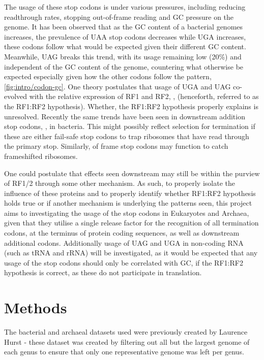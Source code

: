 \documentclass[
    emulatestandardclasses,
    parskip=half,
]{scrartcl}
\begin{document}
        The usage of these stop codons is under various pressures, including reducing readthrough rates, stopping out-of-frame reading and GC pressure on the genome. It has been observed that as the GC content of a bacterial genomes increases, the prevalence of UAA stop codons decreases while UGA increases, these codons follow what would be expected given their different GC content. Meanwhile, UAG breaks this trend, with its usage remaining low (20\%) and independent of the GC content of the genome, countering what otherwise be expected especially given how the other codons follow the pattern, \cref{fig:intro/codon-gc}. One theory postulates that usage of UGA and UAG co-evolved with the relative expression of RF1 and RF2, \mancite\autocite{Korkmaz2014}, (henceforth, referred to as the RF1:RF2 hypothesis). Whether, the RF1:RF2 hypothesis properly explains is unresolved. Recently the same trends have been seen in downstream addition stop codons, \autocite{Ho2019}, in bacteria. This might possibly reflect selection for termination if these are either fail-safe stop codons to trap ribosomes that have read through the primary stop. Similarly, of frame stop codons may function to catch frameshifted ribosomes.

        One could postulate that effects seen downstream may still be within the purview of RF1/2 through some other mechanism. As such, to properly isolate the influence of these proteins and to properly identify whether RF1:RF2 hypothesis holds true or if another mechanism is underlying the patterns seen, this project aims to investigating the usage of the stop codons in Eukaryotes and Archaea, given that they utilise a single release factor for the recognition of all termination codons, at the terminus of protein coding sequences, as well as downstream additional codons. Additionally usage of UAG and UGA in non-coding RNA (such as tRNA and rRNA) will be investigated, as it would be expected that any usage of the stop codons should only be correlated with GC, if the RF1:RF2 hypothesis is correct, as these do not participate in translation.

    \section{Methods}
        The bacterial and archaeal datasets used were previously created by Laurence Hurst - these dataset was created by filtering out all but the largest genome of each genus to ensure that only one representative genome was left per genus.
\end{document}

